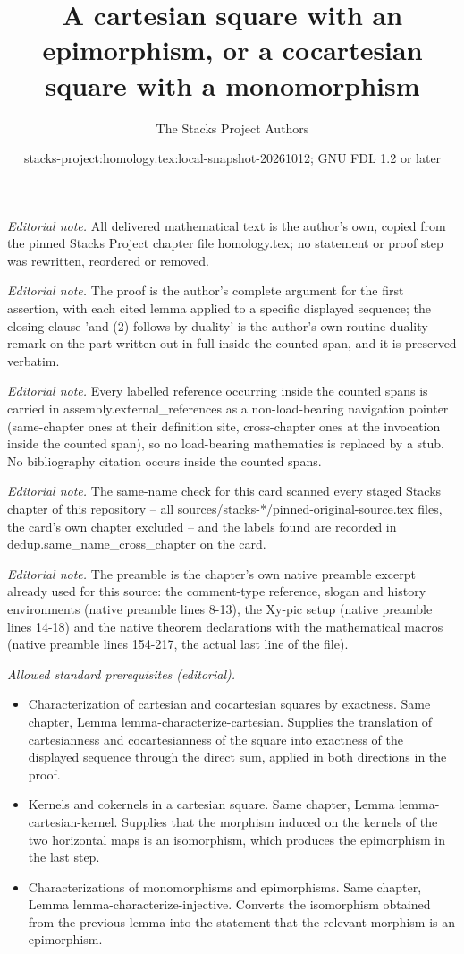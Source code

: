 \documentclass[10pt,a4paper]{amsart}
\title{A cartesian square with an epimorphism, or a cocartesian square with a monomorphism}
\author{The Stacks Project Authors}
\date{stacks-project:homology.tex:local-snapshot-20261012; GNU FDL 1.2 or later}
\theoremstyle{plain}
\theoremstyle{definition}
\theoremstyle{remark}
\numberwithin{equation}{subsection}
\begin{document}
\maketitle
\noindent\textit{Editorial note.} All delivered mathematical text is the author's own, copied from the pinned Stacks Project chapter file homology.tex; no statement or proof step was rewritten, reordered or removed.\par\medskip
\noindent\textit{Editorial note.} The proof is the author's complete argument for the first assertion, with each cited lemma applied to a specific displayed sequence; the closing clause 'and (2) follows by duality' is the author's own routine duality remark on the part written out in full inside the counted span, and it is preserved verbatim.\par\medskip
\noindent\textit{Editorial note.} Every labelled reference occurring inside the counted spans is carried in assembly.external\_references as a non-load-bearing navigation pointer (same-chapter ones at their definition site, cross-chapter ones at the invocation inside the counted span), so no load-bearing mathematics is replaced by a stub. No bibliography citation occurs inside the counted spans.\par\medskip
\noindent\textit{Editorial note.} The same-name check for this card scanned every staged Stacks chapter of this repository -- all sources/stacks-*/pinned-original-source.tex files, the card's own chapter excluded -- and the labels found are recorded in dedup.same\_name\_cross\_chapter on the card.\par\medskip
\noindent\textit{Editorial note.} The preamble is the chapter's own native preamble excerpt already used for this source: the comment-type reference, slogan and history environments (native preamble lines 8-13), the Xy-pic setup (native preamble lines 14-18) and the native theorem declarations with the mathematical macros (native preamble lines 154-217, the actual last line of the file).\par\medskip
\noindent\textit{Allowed standard prerequisites (editorial).}\begin{itemize}
\item Characterization of cartesian and cocartesian squares by exactness. Same chapter, Lemma lemma-characterize-cartesian. Supplies the translation of cartesianness and cocartesianness of the square into exactness of the displayed sequence through the direct sum, applied in both directions in the proof.
\item Kernels and cokernels in a cartesian square. Same chapter, Lemma lemma-cartesian-kernel. Supplies that the morphism induced on the kernels of the two horizontal maps is an isomorphism, which produces the epimorphism in the last step.
\item Characterizations of monomorphisms and epimorphisms. Same chapter, Lemma lemma-characterize-injective. Converts the isomorphism obtained from the previous lemma into the statement that the relevant morphism is an epimorphism.
\end{itemize}\medskip
\end{document}
